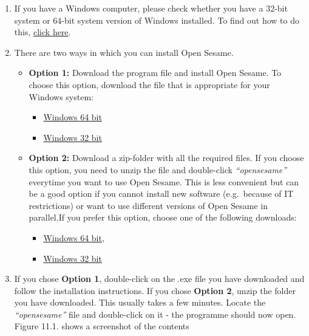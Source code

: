 \documentclass[
]{book}
\providecommand{\tightlist}{%
  \setlength{\itemsep}{0pt}\setlength{\parskip}{0pt}}
\begin{document}
\begin{enumerate}
\def\labelenumi{\arabic{enumi}.}
\tightlist
\item
  If you have a Windows computer, please check whether you have a 32-bit system or 64-bit system version of Windows installed. To find out how to do this, \href{https://www.howtogeek.com/howto/21726/how-do-i-know-if-im-running-32-bit-or-64-bit-windows-answers/}{click here}.
\item
  There are two ways in which you can install Open Sesame.

  \begin{itemize}
  \tightlist
  \item
    \textbf{Option 1:} Download the program file and install Open Sesame. To choose this option, download the file that is appropriate for your Windows system:

    \begin{itemize}
    \tightlist
    \item
      \href{https://github.com/smathot/OpenSesame/releases/download/release\%2F3.3.2/opensesame_3.3.2-py37-win64-1.exe}{Windows 64 bit}
    \item
      \href{https://github.com/smathot/OpenSesame/releases/download/release\%2F3.2.8/opensesame_3.2.8-py2.7-win32-1.exe}{Windows 32 bit}
    \end{itemize}
  \item
    \textbf{Option 2:} Download a zip-folder with all the required files. If you choose this option, you need to unzip the file and double-click \emph{``opensesame''} everytime you want to use Open Sesame. This is less convenient but can be a good option if you cannot install new software (e.g.~because of IT restrictions) or want to use different versions of Open Sesame in parallel.If you prefer this option, choose one of the following downloads:

    \begin{itemize}
    \tightlist
    \item
      \href{https://github.com/smathot/OpenSesame/releases/download/release\%2F3.3.2/opensesame_3.3.2-py37-win64-1.zip}{Windows 64 bit},
    \item
      \href{https://github.com/smathot/OpenSesame/releases/download/release\%2F3.2.8/opensesame_3.2.8-py2.7-win32-1.zip}{Windows 32 bit}
    \end{itemize}
  \end{itemize}
\item
  If you chose \textbf{Option 1}, double-click on the .exe file you have downloaded and follow the installation instructions. If you chose \textbf{Option 2}, unzip the folder you have downloaded. This usually takes a few minutes. Locate the \emph{``opensesame''} file and double-click on it - the programme should now open. Figure 11.1. shows a screenshot of the contents
\end{enumerate}
\end{document}
